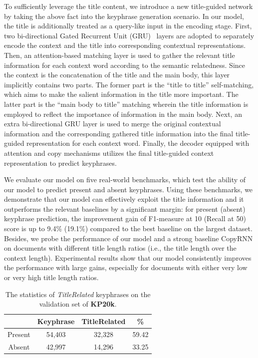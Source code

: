 \documentclass[letterpaper]{article} %
\begin{document}
To sufficiently leverage the title content, we introduce a new title-guided network by taking the above fact into the keyphrase generation scenario. In our model, the title is additionally treated as a query-like input in the encoding stage. First, two bi-directional Gated Recurrent Unit (GRU)~\cite{cho2014learning} layers are adopted to separately encode the context and the title into corresponding contextual representations. Then, an attention-based matching layer is used to gather the relevant title information for each context word according to the semantic relatedness. Since the context is the concatenation of the title and the main body, this layer implicitly contains two parts. The former part is the ``title to title'' self-matching, which aims to make the salient information in the title more important. The latter part is the ``main body to title'' matching wherein the title information is employed to reflect the importance of information in the main body. Next, an extra bi-directional GRU layer is used to merge the original contextual information and the corresponding gathered title information into the final title-guided representation for each context word. Finally, the decoder equipped with attention and copy mechanisms utilizes the final title-guided context representation to predict keyphrases.

We evaluate our model on five real-world benchmarks, which test the ability of our model to predict present and absent keyphrases. Using these benchmarks, we demonstrate that our model can effectively exploit the title information and it outperforms the relevant baselines by a significant margin: for present (absent) keyphrase prediction, the improvement gain of F1-measure at 10 (Recall at 50) score is up to 9.4\% (19.1\%) compared to the best baseline on the largest dataset. Besides, we probe the performance of our model and a strong baseline CopyRNN on documents with different title length ratios (i.e., the title length over the context length). Experimental results show that our model consistently improves the performance with large gains, especially for documents with either very low or very high title length ratios.

\begin{table}[t]
\centering
\begin{tabular}{ c c c c}
\hline
\hline
& Keyphrase & TitleRelated & \% \\
\hline
Present & 54,403 & 32,328 & 59.42 \\
\hline
Absent & 42,997  & 14,296 & 33.25\\
\hline
\end{tabular}
\caption{The statistics of \textit{TitleRelated} keyphrases on the validation set of \textbf{KP20k}.}
\label{table:statistic_study_on_val_set}
\end{table}
\end{document}
